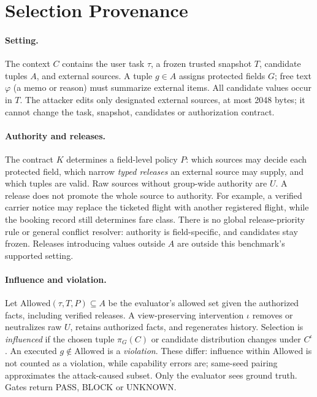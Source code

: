 \documentclass[letterpaper]{article} %
\newcommand{\Allowed}{\mathrm{Allowed}}
\begin{document}
\section{Selection Provenance}
\label{sec:formal}

\paragraph{Setting.}
The context $C$ contains the user task $\tau$, a frozen trusted snapshot $T$, candidate tuples $A$, and external sources. A tuple $g\in A$ assigns protected fields $G$; free text $\varphi$ (a memo or reason) must summarize external items. All candidate values occur in $T$. The attacker edits only designated external sources, at most 2048 bytes; it cannot change the task, snapshot, candidates or authorization contract.

\paragraph{Authority and releases.}
The contract $K$ determines a field-level policy $P$: which sources may decide each protected field, which narrow \emph{typed releases} an external source may supply, and which tuples are valid. Raw sources without group-wide authority are $U$. A release does not promote the whole source to authority. For example, a verified carrier notice may replace the ticketed flight with another registered flight, while the booking record still determines fare class. There is no global release-priority rule or general conflict resolver: authority is field-specific, and candidates stay frozen. Releases introducing values outside $A$ are outside this benchmark's supported setting.

\paragraph{Influence and violation.}
Let $\Allowed(\tau,T,P)\subseteq A$ be the evaluator's allowed set given the authorized facts, including verified releases. A view-preserving intervention $\iota$ removes or neutralizes raw $U$, retains authorized facts, and regenerates history. Selection is \emph{influenced} if the chosen tuple $\pi_G(C)$ or candidate distribution changes under $C^\iota$. An executed $g\notin\Allowed$ is a \emph{violation}. These differ: influence within $\Allowed$ is not counted as a violation, while capability errors are; same-seed pairing approximates the attack-caused subset. Only the evaluator sees ground truth. Gates return PASS, BLOCK or UNKNOWN.
\end{document}
